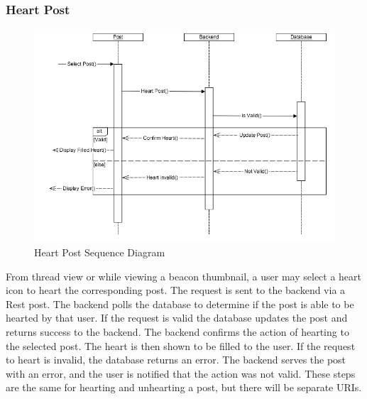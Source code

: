         \subsubsection{Heart Post}
            \begin{figure}[H]
                \centering
                \includegraphics[width=\textwidth]{src/img/heart-post.png}
                \caption{Heart Post Sequence Diagram} 
            \end{figure}

            From thread view or while viewing a beacon thumbnail, a user may
            select a heart icon to heart the corresponding post. The request is
            sent to the backend via a Rest post. The backend polls the database
            to determine if the post is able to be hearted by that user. If the
            request is valid the database updates the post and returns success
            to the backend. The backend confirms the action of hearting to the
            selected post. The heart is then shown to be filled to the user. If
            the request to heart is invalid, the database returns an error. The
            backend serves the post with an error, and the user is notified that
            the action was not valid. These steps are the same for hearting and
            unhearting a post, but there will be separate URIs. 

